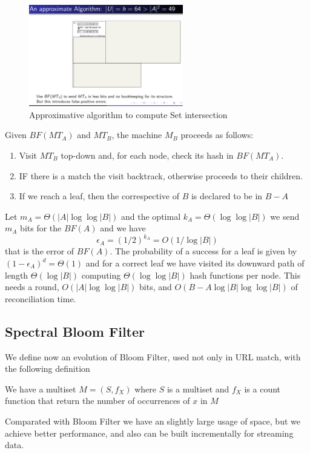\begin{figure}
	\includegraphics[width=0.6\textwidth]{Images/approximativeAlg}
	\caption{Approximative algorithm to compute Set intersection}
	\label{img:approximateAlg}
\end{figure}
Given $BF(MT_A)$ and $MT_B$, the machine $M_B$ proceeds as follows:
\begin{enumerate}
	\item Visit $MT_B$ top-down and, for each node, check its hash in $BF(MT_A)$.
	\item IF there is a match the visit backtrack, otherwise proceeds to their children.
	\item If we reach a leaf, then the correspective of $B$ is declared to be in $B - A$
\end{enumerate}
Let $m_A = \Theta(|A| \log \log |B|)$ and the optimal $k_A = \Theta(\log \log |B|)$ we send $m_A$ bits for the $BF(A)$ and we have
\[ \epsilon_A = (1/2)^{k_A} = O(1/ \log |B|) \] 
that is the error of $BF(A)$.\newline
The probability of a success for a leaf is given by $(1 - \epsilon_A)^d = \Theta(1)$ and for a correct leaf we have visited its downward path of length $\Theta(\log |B|)$ 
computing $\Theta(\log \log |B|)$ hash functions per node.\newline
This needs a round, $O(|A| \log \log |B|)$ bits, and $O(B - A \log |B| \log \log |B|)$ of reconciliation time.

\subsection{Spectral Bloom Filter}
    We define now an evolution of Bloom Filter, used not only in URL match, with the following definition
    \begin{defi}
         We have a multiset $M = (S, f_X)$ where $S$ is a multiset and $f_X$ is a count function that return the number of occurrences of $x$ in $M$
    \end{defi}
    Comparated with Bloom Filter we have an slightly large usage of space, but we achieve better performance, and also can be built incrementally for streaming data.

